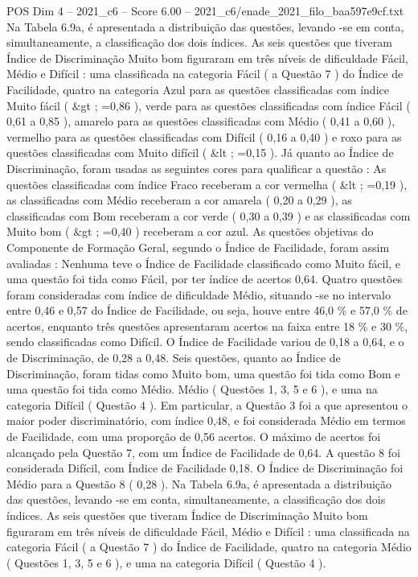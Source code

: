 \begin{textsample}{POS Dim 4 – 2021\_c6 – Score 6.00 – 2021\_c6/enade\_2021\_filo\_baa597e9cf.txt}
Na Tabela 6.9a, é apresentada a distribuição das questões, levando -se em conta, simultaneamente, a classificação dos dois índices.
As seis questões que tiveram Índice de Discriminação Muito bom figuraram em três níveis de dificuldade Fácil, Médio e Difícil : uma classificada na categoria Fácil ( a Questão 7 ) do Índice de Facilidade, quatro na categoria Azul para as questões classificadas com índice Muito fácil ( \&gt ; =0,86 ), verde para as questões classificadas com índice Fácil ( 0,61 a 0,85 ), amarelo para as questões classificadas com Médio ( 0,41 a 0,60 ), vermelho para as questões classificadas com Difícil ( 0,16 a 0,40 ) e roxo para as questões classificadas com Muito difícil ( \&lt ; =0,15 ).
Já quanto ao Índice de Discriminação, foram usadas as seguintes cores para qualificar a questão : As questões classificadas com índice Fraco receberam a cor vermelha ( \&lt ; =0,19 ), as classificadas com Médio receberam a cor amarela ( 0,20 a 0,29 ), as classificadas com Bom receberam a cor verde ( 0,30 a 0,39 ) e as classificadas com Muito bom ( \&gt ; =0,40 ) receberam a cor azul.
As questões objetivas do Componente de Formação Geral, segundo o Índice de Facilidade, foram assim avaliadas : Nenhuma teve o Índice de Facilidade classificado como Muito fácil, e uma questão foi tida como Fácil, por ter índice de acertos 0,64.
Quatro questões foram consideradas com índice de dificuldade Médio, situando -se no intervalo entre 0,46 e 0,57 do Índice de Facilidade, ou seja, houve entre 46,0 \% e 57,0 \% de acertos, enquanto três questões apresentaram acertos na faixa entre 18 \% e 30 \%, sendo classificadas como Difícil.
O Índice de Facilidade variou de 0,18 a 0,64, e o de Discriminação, de 0,28 a 0,48.
Seis questões, quanto ao Índice de Discriminação, foram tidas como Muito bom, uma questão foi tida como Bom e uma questão foi tida como Médio.
Médio ( Questões 1, 3, 5 e 6 ), e uma na categoria Difícil ( Questão 4 ).
Em particular, a Questão 3 foi a que apresentou o maior poder discriminatório, com índice 0,48, e foi considerada Médio em termos de Facilidade, com uma proporção de 0,56 acertos.
O máximo de acertos foi alcançado pela Questão 7, com um Índice de Facilidade de 0,64.
A questão 8 foi considerada Difícil, com Índice de Facilidade 0,18.
O Índice de Discriminação foi Médio para a Questão 8 ( 0,28 ).
Na Tabela 6.9a, é apresentada a distribuição das questões, levando -se em conta, simultaneamente, a classificação dos dois índices.
As seis questões que tiveram Índice de Discriminação Muito bom figuraram em três níveis de dificuldade Fácil, Médio e Difícil : uma classificada na categoria Fácil ( a Questão 7 ) do Índice de Facilidade, quatro na categoria Médio ( Questões 1, 3, 5 e 6 ), e uma na categoria Difícil ( Questão 4 ).

\end{textsample}
